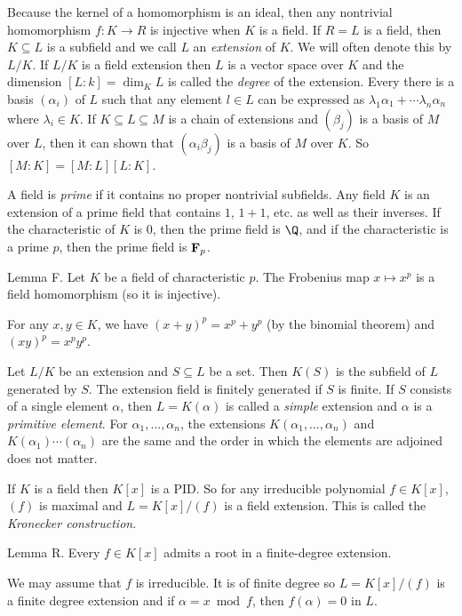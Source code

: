 Because the kernel of a homomorphism is an ideal, then any nontrivial homomorphism $f:K\to R$ is injective when $K$ is a field. If $R = L$ is a field, then $K\subseteq L$ is a subfield and we call $L$ an {\it extension} of $K$. We will  often denote this by $L/K$. If $L/K$ is a field extension then $L$ is a vector space over $K$ and the dimension $[L:k] = \dim_K L$ is called the {\it degree} of the extension. Every there is a basis $(\alpha_i)$ of $L$ such that any element $l\in L$ can be expressed as $\lambda_1\alpha_1 + \cdots \lambda_n\alpha_n$ where $\lambda_i\in K$. If $K\subseteq L\subseteq M$ is a chain of extensions and $(\beta_j)$ is a basis of $M$ over $L$, then it can shown that $(\alpha_i\beta_j)$ is a basis of $M$ over $K$. So $[M:K] = [M:L][L:K]$.

A field is {\it prime} if it contains no proper nontrivial subfields. Any field $K$ is an extension of a prime field that contains $1$, $1+1$, etc. as well as their inverses. If the characteristic of $K$ is 0, then the prime field is $\Q$, and if the characteristic is a prime $p$, then the prime field is ${\bf F}_p$.

\proclaim Lemma F. Let $K$ be a field of characteristic $p$. The Frobenius map $x\mapsto x^p$ is a field homomorphism (so it is injective).

\proof For any $x,y\in K$, we have $(x+y)^p = x^p + y^p$ (by the binomial theorem) and $(xy)^p = x^py^p$.\slug

Let $L/K$ be an extension and $S\subseteq L$ be a set. Then $K(S)$ is the subfield of $L$ generated by $S$. The extension field is finitely generated if $S$ is finite. If $S$ consists of a single element $\alpha$, then $L = K(\alpha)$ is called a {\it simple} extension and $\alpha$ is a {\it primitive element}. For $\alpha_1,\ldots,\alpha_n$, the extensions $K(\alpha_1,\ldots,\alpha_n)$ and $K(\alpha_1)\cdots(\alpha_n)$ are the same and the order in which the elements are adjoined does not matter.

If $K$ is a field then $K[x]$ is a PID. So for any irreducible polynomial $f\in K[x]$, $(f)$ is maximal and $L = K[x]/(f)$ is a field extension. This is called the {\it Kronecker construction}.

\proclaim Lemma R. Every $f\in K[x]$ admits a root in a finite-degree extension.

\proof We may assume that $f$ is irreducible. It is of finite degree so $L = K[x]/(f)$ is a finite degree extension and if $\alpha = x \bmod f$, then $f(\alpha) = 0$ in $L$.\slug

